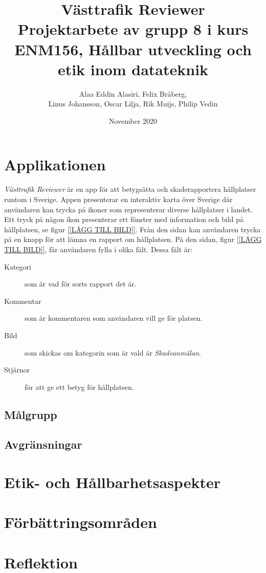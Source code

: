 \documentclass{article}
\title{
  Västtrafik Reviewer \\
  \large Projektarbete av grupp 8 i kurs ENM156, Hållbar utveckling och etik inom datateknik }
\author{Alaa Eddin Alasiri, Felix Bråberg, \\Linus Johansson, Oscar Lilja, Rik Muijs, Philip Vedin}
\date{November 2020}
\begin{document}
\maketitle

\section*{Applikationen}
\textit{Västtrafik Reviewer} är en app för att betygsätta och skaderapportera hållplatser runtom i Sverige. Appen presenterar en interaktiv karta över Sverige där användaren kan trycka på ikoner som representerar diverse hållplatser i landet. Ett tryck på någon ikon presenterar ett fönster med information och bild på hållplatsen, se figur \ref{[LÄGG TILL BILD]}. Från den sidan kan användaren trycka på en knapp för att lämna en rapport om hållplatsen. På den sidan, figur \ref{[LÄGG TILL BILD]}, får användaren fylla i olika fält. Dessa fält är:
\begin{description}
\item[Kategori] som är vad för sorts rapport det är.
\item[Kommentar] som är kommentaren som användaren vill ge för platsen.
\item[Bild] som skickas om kategorin som är vald är \textit{Skadeanmälan}.
\item[Stjärnor] för att ge ett betyg för hållplatsen.
\end{description}

\subsection*{Målgrupp}
\subsection*{Avgränsningar}
\section*{Etik- och Hållbarhetsaspekter}
\section*{Förbättringsområden}
\section*{Reflektion}
\end{document}

